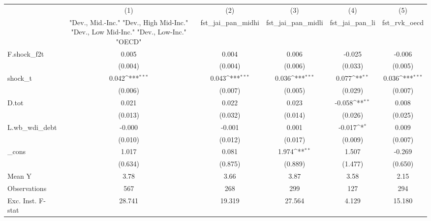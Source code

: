 {
\def\sym#1{\ifmmode^{#1}\else\(^{#1}\)\fi}
\begin{tabular}{l*{5}{c}}
\toprule
            &\multicolumn{1}{c}{(1)}&\multicolumn{1}{c}{(2)}&\multicolumn{1}{c}{(3)}&\multicolumn{1}{c}{(4)}&\multicolumn{1}{c}{(5)}\\
            &\multicolumn{1}{c}{ "Dev., Mid.-Inc." "Dev., High Mid-Inc." "Dev., Low Mid-Inc." "Dev., Low-Inc." "OECD" }&\multicolumn{1}{c}{fst\_jai\_pan\_midhi}&\multicolumn{1}{c}{fst\_jai\_pan\_midli}&\multicolumn{1}{c}{fst\_jai\_pan\_li}&\multicolumn{1}{c}{fst\_rvk\_oecd}\\
\midrule
F.shock\_f2t &       0.005         &       0.004         &       0.006         &      -0.025         &      -0.006         \\
            &     (0.004)         &     (0.004)         &     (0.006)         &     (0.033)         &     (0.005)         \\
\addlinespace
shock\_t     &       0.042\sym{***}&       0.043\sym{***}&       0.036\sym{***}&       0.077\sym{**} &       0.036\sym{***}\\
            &     (0.006)         &     (0.007)         &     (0.005)         &     (0.029)         &     (0.007)         \\
\addlinespace
D.tot       &       0.021         &       0.022         &       0.023         &      -0.058\sym{**} &       0.008         \\
            &     (0.013)         &     (0.032)         &     (0.014)         &     (0.026)         &     (0.025)         \\
\addlinespace
L.wb\_wdi\_debt&      -0.000         &      -0.001         &       0.001         &      -0.017\sym{*}  &       0.009         \\
            &     (0.010)         &     (0.012)         &     (0.017)         &     (0.009)         &     (0.007)         \\
\addlinespace
\_cons      &       1.017         &       0.081         &       1.974\sym{**} &       1.507         &      -0.269         \\
            &     (0.634)         &     (0.875)         &     (0.889)         &     (1.477)         &     (0.650)         \\
\midrule
Mean Y      &        3.78         &        3.66         &        3.87         &        3.58         &        2.15         \\
Observations&         567         &         268         &         299         &         127         &         294         \\
Exc. Inst. F-stat&      28.741         &      19.319         &      27.564         &       4.129         &      15.180         \\
\bottomrule
\end{tabular}
}
